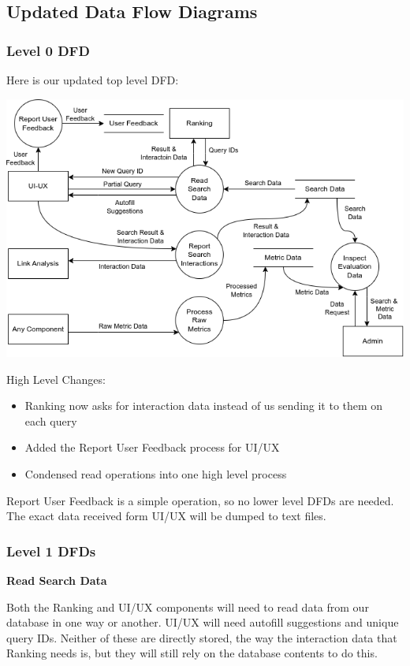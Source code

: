 \subsection*{Updated Data Flow Diagrams}

\subsubsection*{Level 0 DFD}

Here is our updated top level DFD:

\begin{center}
  \includegraphics[scale=0.5]{DFDs/HighLevelDFD.drawio (1).png}
\end{center}
High Level Changes:
\begin{itemize}
  \item Ranking now asks for interaction data instead of us sending it to them on each query
  \item Added the Report User Feedback process for UI/UX
  \item Condensed read operations into one high level process
\end{itemize}

Report User Feedback is a simple operation, so no lower level DFDs are needed. The exact data received form UI/UX will be dumped to text files.

\newpage
\subsubsection*{Level 1 DFDs}

\textbf{Read Search Data}

\medskip

Both the Ranking and UI/UX components will need to read data from our database in one way or another. UI/UX will need autofill suggestions and unique query IDs. Neither of these are directly stored, the way the interaction data that Ranking needs is, but they will still rely on the database contents to do this.

